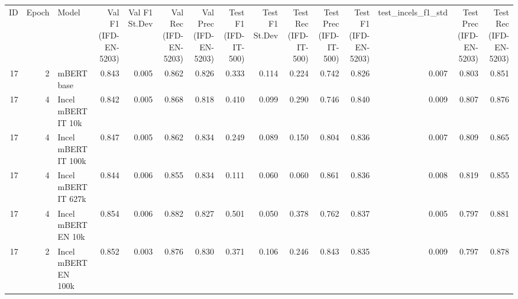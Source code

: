 \begin{tabular}{rrlrrrrrrrrrrrr}
\hline
 ID &  Epoch &               Model &  Val F1 (IFD-EN-5203) &  Val F1 St.Dev &  Val Rec (IFD-EN-5203) &  Val Prec (IFD-EN-5203) &  Test F1 (IFD-IT-500) &  Test F1 St.Dev &  Test Rec (IFD-IT-500) &  Test Prec (IFD-IT-500) &  Test F1 (IFD-EN-5203) &  test\_incels\_f1\_std &  Test Prec (IFD-EN-5203) &  Test Rec (IFD-EN-5203) \\
 17 &      2 &          mBERT base &                 0.843 &          0.005 &                  0.862 &                   0.826 &                 0.333 &           0.114 &                  0.224 &                   0.742 &                  0.826 &               0.007 &                    0.803 &                   0.851 \\
 17 &      4 &  Incel mBERT IT 10k &                 0.842 &          0.005 &                  0.868 &                   0.818 &                 0.410 &           0.099 &                  0.290 &                   0.746 &                  0.840 &               0.009 &                    0.807 &                   0.876 \\
 17 &      4 & Incel mBERT IT 100k &                 0.847 &          0.005 &                  0.862 &                   0.834 &                 0.249 &           0.089 &                  0.150 &                   0.804 &                  0.836 &               0.007 &                    0.809 &                   0.865 \\
 17 &      4 & Incel mBERT IT 627k &                 0.844 &          0.006 &                  0.855 &                   0.834 &                 0.111 &           0.060 &                  0.060 &                   0.861 &                  0.836 &               0.008 &                    0.819 &                   0.855 \\
 17 &      4 &  Incel mBERT EN 10k &                 0.854 &          0.006 &                  0.882 &                   0.827 &                 0.501 &           0.050 &                  0.378 &                   0.762 &                  0.837 &               0.005 &                    0.797 &                   0.881 \\
 17 &      2 & Incel mBERT EN 100k &                 0.852 &          0.003 &                  0.876 &                   0.830 &                 0.371 &           0.106 &                  0.246 &                   0.843 &                  0.835 &               0.009 &                    0.797 &                   0.878 \\

\end{tabular}
